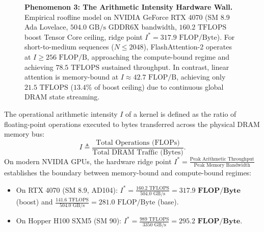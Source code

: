 \begin{figure}[t]
{
}
\caption[Phenomenon 3]{\textbf{Phenomenon 3: The Arithmetic Intensity Hardware Wall.} Empirical roofline model on NVIDIA GeForce RTX 4070 (SM 8.9 Ada Lovelace, $504.0\text{ GB/s}$ GDDR6X bandwidth, $160.2\text{ TFLOPS}$ boost Tensor Core ceiling, ridge point $I^* = 317.9\text{ FLOP/Byte}$). For short-to-medium sequences ($N \le 2048$), FlashAttention-2 operates at $I \ge 256\text{ FLOP/B}$, approaching the compute-bound regime and achieving $78.5\text{ TFLOPS}$ sustained throughput. In contrast, linear attention is memory-bound at $I \approx 42.7\text{ FLOP/B}$, achieving only $21.5\text{ TFLOPS}$ ($13.4\%$ of boost ceiling) due to continuous global DRAM state streaming.}
\label{fig:phenom3_roofline_wall}
\end{figure}

The operational arithmetic intensity $I$ of a kernel is defined as the ratio of floating-point operations executed to bytes transferred across the physical DRAM memory bus:
\begin{equation}
I \triangleq \frac{\text{Total Operations (FLOPs)}}{\text{Total DRAM Traffic (Bytes)}}.
\end{equation}
On modern NVIDIA GPUs, the hardware ridge point $I^* = \frac{\text{Peak Arithmetic Throughput}}{\text{Peak Memory Bandwidth}}$ establishes the boundary between memory-bound and compute-bound regimes:
\begin{itemize}
    \item On RTX 4070 (SM 8.9, AD104): $I^* = \frac{160.2\text{ TFLOPS}}{504.0\text{ GB/s}} = \mathbf{317.9\text{ FLOP/Byte}}$ (boost) and $\frac{141.6\text{ TFLOPS}}{504.0\text{ GB/s}} = 281.0\text{ FLOP/Byte}$ (base).
    \item On Hopper H100 SXM5 (SM 90): $I^* = \frac{989\text{ TFLOPS}}{3350\text{ GB/s}} = \mathbf{295.2\text{ FLOP/Byte}}$.
\end{itemize}

